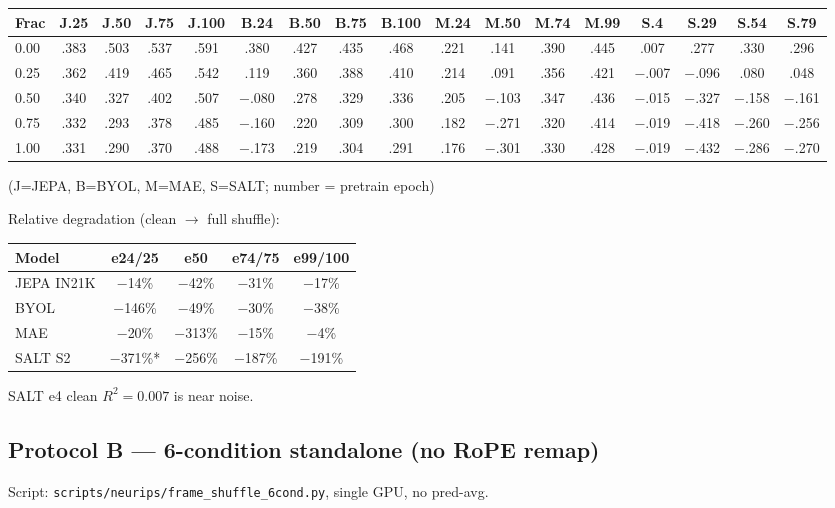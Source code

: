 \documentclass{article}
\begin{document}
\begin{center}
\small
\begin{tabular}{lcccccccccccccccc}
\toprule
Frac & J.25 & J.50 & J.75 & J.100 & B.24 & B.50 & B.75 & B.100 & M.24 & M.50 & M.74 & M.99 & S.4 & S.29 & S.54 & S.79 \\
\midrule
0.00 & .383 & .503 & .537 & .591 & .380 & .427 & .435 & .468 & .221 & .141 & .390 & .445 & .007 & .277 & .330 & .296 \\
0.25 & .362 & .419 & .465 & .542 & .119 & .360 & .388 & .410 & .214 & .091 & .356 & .421 & $-$.007 & $-$.096 & .080 & .048 \\
0.50 & .340 & .327 & .402 & .507 & $-$.080 & .278 & .329 & .336 & .205 & $-$.103 & .347 & .436 & $-$.015 & $-$.327 & $-$.158 & $-$.161 \\
0.75 & .332 & .293 & .378 & .485 & $-$.160 & .220 & .309 & .300 & .182 & $-$.271 & .320 & .414 & $-$.019 & $-$.418 & $-$.260 & $-$.256 \\
1.00 & .331 & .290 & .370 & .488 & $-$.173 & .219 & .304 & .291 & .176 & $-$.301 & .330 & .428 & $-$.019 & $-$.432 & $-$.286 & $-$.270 \\
\bottomrule
\end{tabular}
\end{center}
(J=JEPA, B=BYOL, M=MAE, S=SALT; number = pretrain epoch)

Relative degradation (clean $\to$ full shuffle):

\begin{center}
\begin{tabular}{lcccc}
\toprule
Model & e24/25 & e50 & e74/75 & e99/100 \\
\midrule
JEPA IN21K & $-$14\% & $-$42\% & $-$31\% & $-$17\% \\
BYOL       & $-$146\% & $-$49\% & $-$30\% & $-$38\% \\
MAE        & $-$20\% & $-$313\% & $-$15\% & $-$4\% \\
SALT S2    & $-$371\%* & $-$256\% & $-$187\% & $-$191\% \\
\bottomrule
\end{tabular}
\end{center}
\small *SALT e4 clean $R^2=0.007$ is near noise.

\subsection{Protocol B --- 6-condition standalone (no RoPE remap)}

Script: \texttt{scripts/neurips/frame\_shuffle\_6cond.py}, single GPU, no pred-avg.
\end{document}
